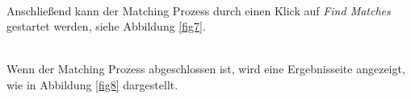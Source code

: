 		\\
		Anschließend kann der Matching Prozess durch einen Klick auf \textit{Find
		Matches} gestartet werden, siehe Abbildung \ref{fig7}.\\
		\begin{minipage}{\linewidth}
			\label{fig7}  
		\end{minipage}
		\\
		Wenn der Matching Prozess abgeschlossen ist, wird eine Ergebnisseite
		angezeigt, wie in Abbildung \ref{fig8} dargestellt.\\
		\begin{minipage}{\linewidth}
			\label{fig8}  
		\end{minipage}
		
